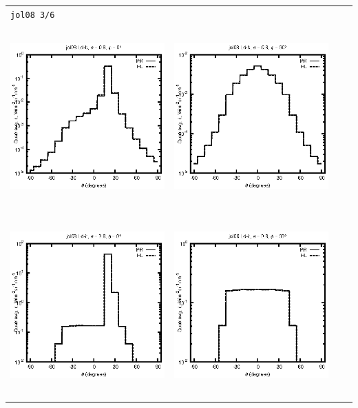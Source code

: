 \begin{tabular}{c c c c}
\multicolumn{4}{l}{\texttt{jol08 3/6}} \\
\includegraphics[height=7cm]{../eps/jol08_Ld_b_fwd.eps} &
\includegraphics[height=7cm]{../eps/jol08_Ld_b_cross.eps} \\
\includegraphics[height=7cm]{../eps/jol08_Ld_it_fwd.eps} &
\includegraphics[height=7cm]{../eps/jol08_Ld_it_cross.eps} \\

\end{tabular}

